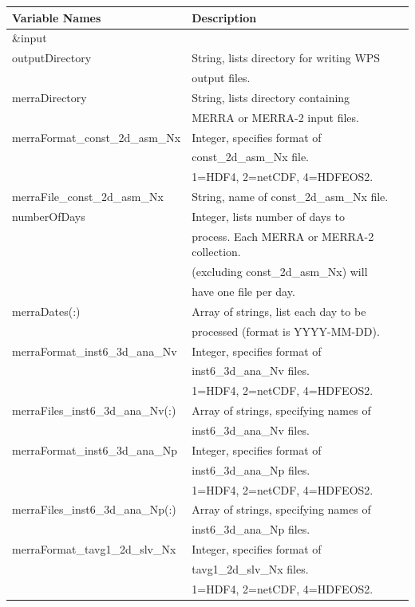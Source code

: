\begin{tabular}{|l|l|} \hline
Variable Names & Description \\ \hline
\&input          & \\ \hline
outputDirectory  & String, lists directory for writing WPS \\
                 & output files. \\ \hline
merraDirectory   & String, lists directory containing \\
                 & MERRA or MERRA-2 input files. \\ \hline
merraFormat\_const\_2d\_asm\_Nx & Integer, specifies format of\\
 &  const\_2d\_asm\_Nx file. \\ 
 &  1=HDF4, 2=netCDF, 4=HDFEOS2. \\ \hline
merraFile\_const\_2d\_asm\_Nx & String, name of const\_2d\_asm\_Nx file. \\ \hline
numberOfDays & Integer, lists number of days to \\
& process. Each MERRA or MERRA-2 collection. \\
& (excluding const\_2d\_asm\_Nx) will \\
& have one file per day. \\ \hline
merraDates(:) & Array of strings, list each day to be\\
 &  processed (format is YYYY-MM-DD). \\ \hline
merraFormat\_inst6\_3d\_ana\_Nv & Integer, specifies format of\\
 & inst6\_3d\_ana\_Nv files.\\
 &  1=HDF4, 2=netCDF, 4=HDFEOS2. \\ \hline
merraFiles\_inst6\_3d\_ana\_Nv(:) & Array of strings, specifying names of \\
 & inst6\_3d\_ana\_Nv files. \\ \hline
merraFormat\_inst6\_3d\_ana\_Np & Integer, specifies format of\\
 & inst6\_3d\_ana\_Np files. \\
 & 1=HDF4, 2=netCDF, 4=HDFEOS2. \\ \hline
merraFiles\_inst6\_3d\_ana\_Np(:) & Array of strings, specifying names of\\
 & inst6\_3d\_ana\_Np files. \\ \hline
merraFormat\_tavg1\_2d\_slv\_Nx & Integer, specifies format of \\
 & tavg1\_2d\_slv\_Nx files. \\
 & 1=HDF4, 2=netCDF, 4=HDFEOS2. \\ \hline

\end{tabular}
